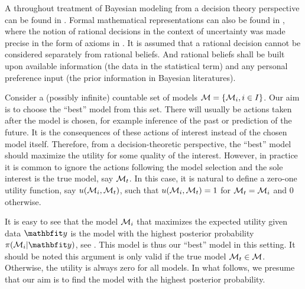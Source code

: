 A throughout treatment of Bayesian modeling from a decision theory perspective
can be found in \textcite{Robert:2007tc}. Formal mathematical representations
can also be found in \textcite[][sec.~5.1 and sec.~6.1]{Bernardo:1994vd},
where the notion of rational decisions in the context of uncertainty was made
precise in the form of axioms in \textcite[][chap.~2]{Bernardo:1994vd}. It is
assumed that a rational decision cannot be considered separately from rational
beliefs. And rational beliefs shall be built upon available information (the
data in the statistical term) and any personal preference input (the prior
information in Bayesian literatures).

Consider a (possibly infinite) countable set of models $\mathcal{M} = \{\mathcal{M}_i,
i\in I\}$. Our aim is to choose the ``best'' model from this set. There will
usually be actions taken after the model is chosen, for example inference of
the past or prediction of the future. It is the consequences of these actions
of interest instead of the chosen model itself. Therefore, from a
decision-theoretic perspective, the ``best'' model should maximize the utility
for some quality of the interest. However, in practice it is common to ignore
the actions following the model selection and the sole interest is the true
model, say $\mathcal{M}_t$. In this case, it is natural to define a zero-one utility
function, say $u(\mathcal{M}_i,\mathcal{M}_t)$, such that $u(\mathcal{M}_i,\mathcal{M}_t) = 1$ for
$\mathcal{M}_t = \mathcal{M}_i$ and $0$ otherwise.

It is easy to see that the model $\mathcal{M}_i$ that maximizes the expected utility
given data $\data$ is the model with the highest posterior probability
$\pi(\calM_i|\data)$, see \textcite[][chap.~6]{Bernardo:1994vd}. This model is
thus our ``best'' model in this setting. It should be noted this argument is
only valid if the true model $\mathcal{M}_t \in \mathcal{M}$. Otherwise, the utility is
always zero for all models. In what follows, we presume that our aim is to
find the model with the highest posterior probability.

